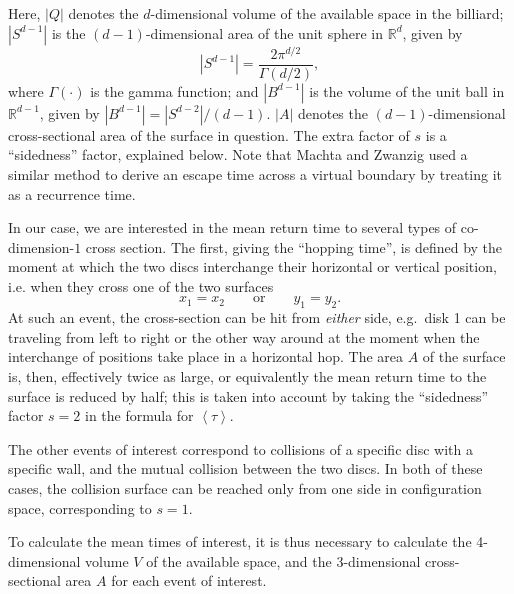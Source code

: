 \documentclass[superscriptaddress,pre,reprint,showpacs,twocolumn]{revtex4-1}
\newcommand{\mean}[1]{\left \langle #1 \right \rangle}
\newcommand{\RR}{\mathbb{R}}
\begin{document}
Here, $|Q|$ denotes the $d$-dimensional volume of the available 
space in the billiard;
 $|S^{d-1}|$ is the $(d-1)$-dimensional area of the unit sphere in $\RR^d$, given by
\begin{equation}
  |S^{d-1}| = \frac{2 \pi^{d/2}}{\Gamma(d/2)},
\end{equation}
where $\Gamma(\cdot)$ is the gamma function; and 
$|B^{d-1}|$ is the volume of the unit ball 
in $\RR^{d-1}$, given by $|B^{d-1}| = |S^{d-2}| / (d-1)$.
$|A|$ denotes the $(d-1)$-dimensional cross-sectional area of the surface in question.
The extra factor of $s$ is a ``sidedness'' factor, explained below.
Note that Machta and Zwanzig \cite{MachtaZwan} used a similar method to derive an escape 
time across a virtual boundary by treating it as a recurrence time.

In our case, we are interested in the mean return time to 
several types of co-dimension-$1$ cross section.
The first, giving the ``hopping time'', 
is defined by the moment
at which the two discs interchange their horizontal or vertical position, i.e.
when they cross one of the two surfaces
\begin{equation} \label{condchoque}
x_1 = x_2  \qquad \text{or} \qquad y_1 = y_2.
\end{equation}
At such an event, the cross-section can be hit from \emph{either} side,
e.g.~disk 1 can be traveling from left to right or the other way around
at the moment when the interchange of positions take place in a horizontal hop.
The area $A$ of the surface is, then, 
effectively twice as large, or equivalently the mean return time to the surface is reduced by half; this is taken into account by taking the ``sidedness'' factor $s=2$ in the formula for $\mean{\tau}$.

The other events of interest correspond to collisions of a specific
disc with a specific wall, and the mutual collision between the two discs.
In both of these cases, the collision surface can be reached only from one side in configuration space, corresponding to $s = 1$.

To calculate the mean times of interest, it is thus necessary to calculate
the 4-dimensional volume $V$ of the available space, and the 3-dimensional cross-sectional area $A$ 
for each event of interest. 
\end{document}
